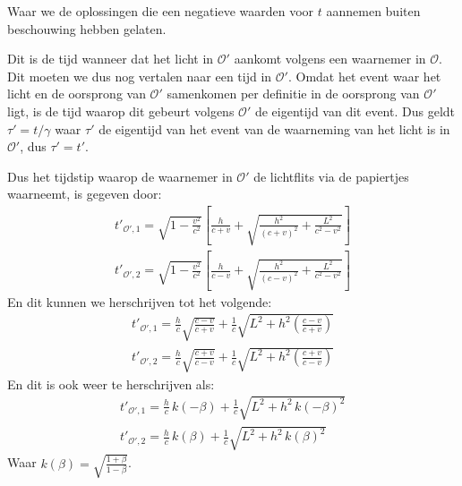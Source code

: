 \documentclass[12pt, dutch, a4paper]{article}
\begin{document}
\begin{enumerate}[(a).]
    Waar we de oplossingen die een negatieve waarden voor $t$ aannemen buiten beschouwing
    hebben gelaten.

    Dit is de tijd wanneer dat het licht in $\mathcal{O}'$ aankomt volgens een waarnemer in $\mathcal{O}$.
    Dit moeten we dus nog vertalen naar een tijd in $\mathcal{O}'$.
    Omdat het event waar het licht en de oorsprong van $\mathcal{O}'$ samenkomen per definitie
    in de oorsprong van $\mathcal{O}'$ ligt, 
    is de tijd waarop dit gebeurt volgens $\mathcal{O}'$ de eigentijd van dit event.
    Dus geldt $\tau' = t / \gamma$ 
    waar $\tau'$ de eigentijd van het event van de waarneming van het licht is in $\mathcal{O}'$, dus
    $\tau' = t'$.

    Dus het tijdstip waarop de waarnemer in $\mathcal{O}'$
    de lichtflits via de papiertjes waarneemt, is gegeven door:
    \begin{equation} 
        \begin{split}
            t'_{\mathcal{O}',1} = \sqrt{1 - \frac{v^2}{c^2}} \left[\frac{h}{c + v} +
            \sqrt{\frac{h^{2}}{\left(c + v\right)^{2}}+\frac{L^{2}}{c^{2}- v^{2}}}\right]\\
            t'_{\mathcal{O}',2} = \sqrt{1 - \frac{v^2}{c^2}} \left[\frac{h}{c-v}+
            \sqrt{\frac{h^{2}}{\left(c-v\right)^{2}}+\frac{L^{2}}{c^{2}-v^{2}}}\right]
        \end{split}
    \end{equation} 
    En dit kunnen we herschrijven tot het volgende:
    \begin{equation} \label{eq8}
        \begin{split}
            t'_{\mathcal{O}',1} = \frac{h}{c}\sqrt{\frac{c-v}{c+v}}+
            \frac{1}{c}\sqrt{L^{2} + h^{2}\left(\frac{c-v}{c+v}\right)}\\
            t'_{\mathcal{O}',2} = \frac{h}{c}\sqrt{\frac{c+v}{c-v}}+
            \frac{1}{c}\sqrt{L^{2} + h^{2}\left(\frac{c+v}{c-v}\right)}
        \end{split}
    \end{equation}
    En dit is ook weer te herschrijven als:
    \begin{equation}
        \begin{split}
            t'_{\mathcal{O}',1} = \frac{h}{c} \, k(-\beta)+
            \frac{1}{c}\sqrt{L^{2} + h^2\,k(-\beta)^2}\\
            t'_{\mathcal{O}',2} = \frac{h}{c} \, k(\beta)+
            \frac{1}{c}\sqrt{L^{2} + h^2\,k(\beta)^2}
        \end{split}
    \end{equation}
    Waar $k(\beta) = \sqrt{\frac{1+\beta}{1-\beta}}$.


\end{enumerate}
\end{document}
